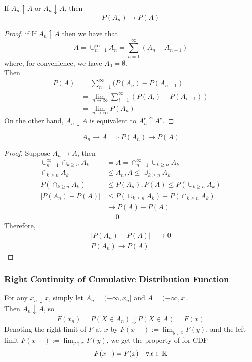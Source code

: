 \documentclass[11pt]{article}
\numberwithin{equation}{section}
\begin{document}
\proposition
If $A_n \uparrow A$ or $A_n \downarrow A$, then
$$P(A_n) \rightarrow P(A)$$
\begin{proof}
	if If $A_n \uparrow A$ then we have that 
	$$ A = \cup_{n=1}^\infty A_n = \sum_{n=1}^\infty (A_n - A_{n-1})$$
	where, for convenience, we have $A_0 = \emptyset$. \\
	Then
	\begin{align*}
		P(A) &= \sum_{n=1}^\infty (P(A_n) - P(A_{n-1}) \\
		&= \lim_{n \rightarrow \infty}\sum_{i=1}^\infty (P(A_i) - P(A_{i-1})) \\
		&= \lim_{n \rightarrow \infty} P(A_n)
	\end{align*}
	On the other hand, $A_n \downarrow A$ is equivalent to $A_n^c \uparrow A^c$.
\end{proof}

\begin{equation}
	A_n \rightarrow A \implies P(A_n) \rightarrow P(A)
\end{equation}
\begin{proof}
	Suppose $A_n \rightarrow A$, then
	\begin{align*}
		\cup_{n=1}^\infty\cap_{k\geq n}A_k &= A = \cap_{n=1}^\infty\cup_{k\geq n}A_k \\
		\cap_{k\geq n}A_k &\leq A_n, A \leq \cup_{k\geq n}A_k \\
		P(\cap_{k\geq n}A_k) &\leq P(A_n), P(A) \leq P(\cup_{k\geq n}A_k) \\
		|P(A_n) - P(A)| & \leq P(\cup_{k\geq n}A_k) - P(\cap_{k\geq n}A_k) \\
		& \rightarrow P(A) - P(A) \\
		&= 0
	\end{align*}
	Therefore, 
	\begin{align*}
		|P(A_n) - P(A)| &\rightarrow 0 \\
		P(A_n) \rightarrow P(A)
	\end{align*}
\end{proof}

\subsubsection{Right Continuity of Cumulative Distribution Function}
For any $x_n \downarrow x$, simply let $A_n = (-\infty, x_n]$ and $A=(-\infty, x]$. \\
Then $A_n \downarrow A$, so 
$$F(x_n) = P(X \in A_n) \downarrow P(X \in A) = F(x)$$
Denoting the right-limit of $F$ at $x$ by $F(x+) := \lim_{y\downarrow x}F(y)$, and the left-limit $F(x-) := \lim_{y\uparrow x}F(y)$, we get the property of  for CDF
\begin{equation}
	F(x+) = F(x) \quad \forall x \in \mathbb{R}
\end{equation}
\end{document}
